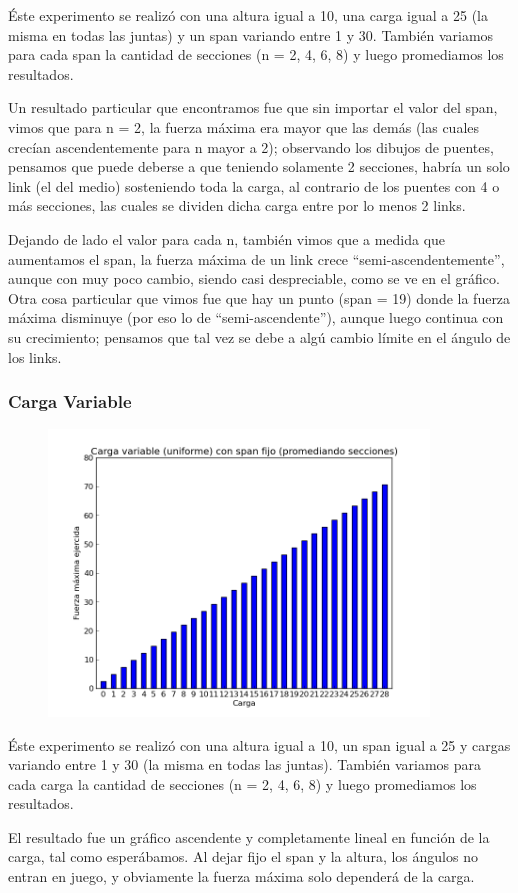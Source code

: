 \'Este experimento se realiz\'o con una altura igual a 10, una carga igual a 25 (la misma en todas las juntas) y un span variando entre 1 y 30. 
Tambi\'en variamos para cada span la cantidad de secciones (n = 2, 4, 6, 8) y luego promediamos los resultados. 

Un resultado particular que encontramos fue que sin importar el valor del span, vimos que para n = 2, la fuerza m\'axima era mayor que las dem\'as
(las cuales crec\'ian ascendentemente para n mayor a 2); observando los dibujos de puentes, pensamos que puede deberse a que teniendo solamente 2 secciones,
habr\'ia un solo link (el del medio) sosteniendo toda la carga, al contrario de los puentes con 4 o m\'as secciones, las cuales se dividen dicha carga
entre por lo menos 2 links.

Dejando de lado el valor para cada n, tambi\'en vimos que a medida que aumentamos el span, la fuerza m\'axima de un link crece ``semi-ascendentemente'', aunque con
muy poco cambio, siendo casi despreciable, como se ve en el gr\'afico. Otra cosa particular que vimos fue que hay un punto (span = 19) donde la fuerza
m\'axima disminuye (por eso lo de ``semi-ascendente''), aunque luego continua con su crecimiento; pensamos que tal vez se debe a alg\'u cambio l\'imite 
en el \'angulo de los links.

 
\subsubsection{Carga Variable}

\begin{figure}[H]
  \centering
    \includegraphics[width=0.9\textwidth]{../mediciones/cargaVariable.png}
    \caption{}
\end{figure}

\'Este experimento se realiz\'o con una altura igual a 10, un span igual a 25 y cargas variando entre 1 y 30 (la misma en todas las juntas). 
Tambi\'en variamos para cada carga la cantidad de secciones (n = 2, 4, 6, 8) y luego promediamos los resultados. 

El resultado fue un gr\'afico ascendente y completamente lineal en funci\'on de la carga, tal como esper\'abamos.
Al dejar fijo el span y la altura, los \'angulos no entran en juego, y obviamente la fuerza m\'axima solo depender\'a de la carga.